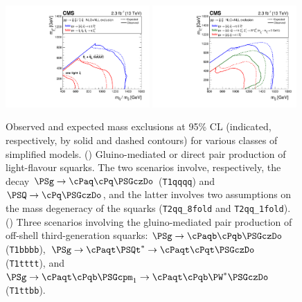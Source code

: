 \begin{figure}[htb!]
  \centering
    \includegraphics[width=0.49\textwidth]{Figure_007-a.pdf}
    \includegraphics[width=0.49\textwidth]{Figure_007-b.pdf}
    \caption{Observed and expected mass exclusions at 95\% CL
      (indicated, respectively, by solid and dashed contours) for
      various classes of simplified models. (\cmsLeft) Gluino-mediated or
      direct pair production of light-flavour squarks. The two
      scenarios involve, respectively, the decay
      $\PSg\to \cPaq\cPq\PSGczDo$ (\texttt{T1qqqq}) and
      $\PSQ\to \cPq\PSGczDo$, and the latter involves two assumptions on
      the mass degeneracy of the squarks (\texttt{T2qq\_8fold} and
      \texttt{T2qq\_1fold}). (\cmsRight) Three scenarios involving the
      gluino-mediated pair production of off-shell third-generation
      squarks: $\PSg\to \cPaqb\cPqb\PSGczDo$ (\texttt{T1bbbb}),
      $\PSg\to \cPaqt\PSQt^*\to \cPaqt\cPqt\PSGczDo$ (\texttt{T1tttt}),
      and $\PSg\to \cPaqt\cPqb\PSGcpm_1\to \cPaqt\cPqb\PW^*\PSGczDo$
      (\texttt{T1ttbb}).  }
    \label{fig:limits-sms-1}
\end{figure}

